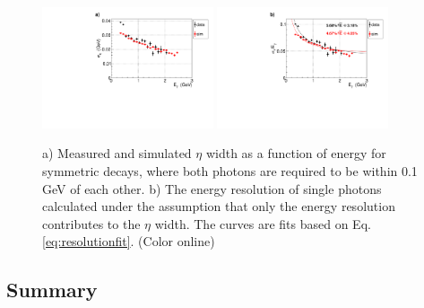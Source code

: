 \begin{figure}[tbh]\centering
\includegraphics[width=0.45\textwidth]{figures/mcsmear50_37_gPsym100_etamass_sigma.pdf}   
\includegraphics[width=0.45\textwidth]{figures/mcsmear50_37_gPsym100_E_sigma.pdf}
\caption{\label{fig:bcal:eta_resolution}
a)  Measured and simulated  $\eta$ width as a function of energy for symmetric decays, where both photons are required to be within 0.1 GeV of each other. 
b) The energy resolution of single photons calculated under the assumption that only the energy resolution contributes to the $\eta$ width. The curves are fits based on  Eq.\,\ref{eq:resolutionfit}.
(Color online)
 }
\end{figure}    






\subsection{Summary \label{sec:calsummary}}